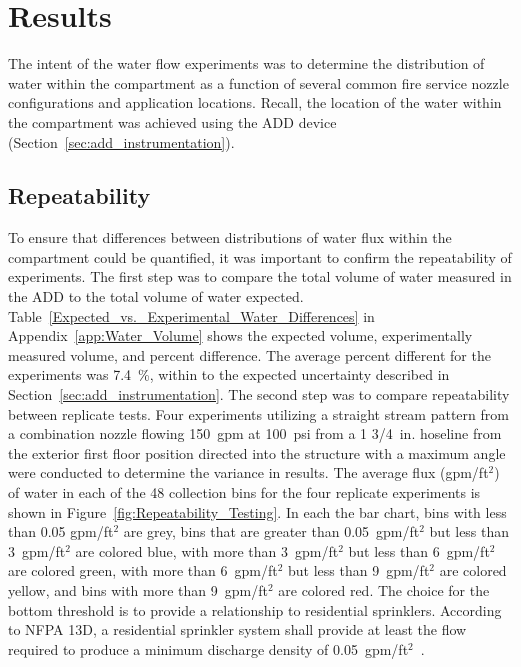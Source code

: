 \documentclass[12pt,oneside]{book}
\begin{document}
\chapter{Results}

The intent of the water flow experiments was to determine the distribution of water within the compartment as a function of several common fire service nozzle configurations and application locations. Recall, the location of the water within the compartment was achieved using the ADD device (Section~\ref{sec:add_instrumentation}). 

\section{Repeatability}
\label{sec:repeat}
To ensure that differences between distributions of water flux within the compartment could be quantified, it was important to confirm the repeatability of experiments. The first step was to compare the total volume of water measured in the ADD to the total volume of water expected. Table~\ref{Expected_vs._Experimental_Water_Differences} in Appendix~\ref{app:Water_Volume} shows the expected volume, experimentally measured volume, and percent difference. The average percent different for the experiments was 7.4~\%, within to the expected uncertainty described in Section~\ref{sec:add_instrumentation}. The second step was to compare repeatability between replicate tests. Four experiments utilizing a straight stream pattern from a combination nozzle flowing 150~gpm at 100~psi from a 1 3/4~in. hoseline from the exterior first floor position directed into the structure with a maximum angle were conducted to determine the variance in results. The average flux (gpm/ft$^2$) of water in each of the 48 collection bins for the four replicate experiments is shown in Figure~\ref{fig:Repeatability_Testing}. In each the ba{}r chart, bins with less than 0.05 gpm/ft$^2$ are grey, bins that are greater than 0.05~gpm/ft$^2$ but less than 3~gpm/ft$^2$ are colored blue, with more than 3~gpm/ft$^2$ but less than 6~gpm/ft$^2$ are colored green, with more than 6~gpm/ft$^2$ but less than 9~gpm/ft$^2$ are colored yellow, and bins with more than 9~gpm/ft$^2$ are colored red. The choice for the bottom threshold is to provide a relationship to residential sprinklers. According to NFPA 13D, a residential sprinkler system shall provide at least the flow required to produce a minimum discharge density of 0.05~gpm/ft$^2$~\cite{NFPA_13D}.
\end{document}
